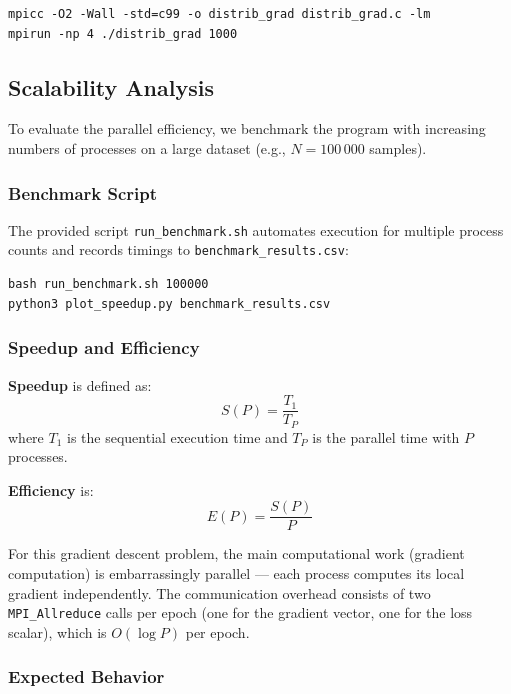 \documentclass[11pt,a4paper]{article}
\begin{document}
\begin{verbatim}
mpicc -O2 -Wall -std=c99 -o distrib_grad distrib_grad.c -lm
mpirun -np 4 ./distrib_grad 1000
\end{verbatim}

\subsection{Scalability Analysis}

To evaluate the parallel efficiency, we benchmark the program with increasing numbers of processes on a large dataset (e.g., $N = 100\,000$ samples).

\subsubsection{Benchmark Script}

The provided script \texttt{run\_benchmark.sh} automates execution for multiple process counts and records timings to \texttt{benchmark\_results.csv}:

\begin{verbatim}
bash run_benchmark.sh 100000
python3 plot_speedup.py benchmark_results.csv
\end{verbatim}

\subsubsection{Speedup and Efficiency}

\textbf{Speedup} is defined as:
$$S(P) = \frac{T_1}{T_P}$$
where $T_1$ is the sequential execution time and $T_P$ is the parallel time with $P$ processes.

\textbf{Efficiency} is:
$$E(P) = \frac{S(P)}{P}$$

For this gradient descent problem, the main computational work (gradient computation) is embarrassingly parallel --- each process computes its local gradient independently. The communication overhead consists of two \texttt{MPI\_Allreduce} calls per epoch (one for the gradient vector, one for the loss scalar), which is $O(\log P)$ per epoch.

\subsubsection{Expected Behavior}
\end{document}
